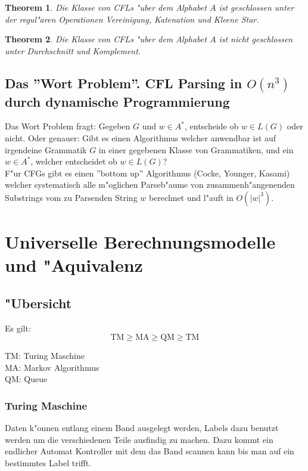 \documentclass[german, 10pt, a4paper, twocolumn]{scrartcl}
\newtheorem{theorem}{Theorem}[section]
\theoremstyle{definition}
\theoremstyle{example}
\begin{document}
\begin{theorem}
	Die Klasse von CFLs "uber dem Alphabet $A$ ist geschlossen unter der regul"aren Operationen Vereinigung, Katenation und Kleene Star.
\end{theorem}

\begin{theorem}
	Die Klasse von CFLs "uber dem Alphabet $A$ ist nicht geschlossen unter Durchschnitt und Komplement.
\end{theorem}

\subsection{Das ''Wort Problem''. CFL Parsing in $O(n^3)$ durch dynamische Programmierung}

Das Wort Problem fragt: Gegeben $G$ und $w\in A^*$, entscheide ob $w \in L(G)$ oder nicht. Oder genauer: Gibt es einen Algorithmus welcher anwendbar ist auf irgendeine Grammatik $G$ in einer gegebenen Klasse von Grammatiken, und ein $w\in A^*$, welcher entscheidet ob $w\in L(G)$?\\

F"ur CFGs gibt es einen ''bottom up'' Algorithmus (Cocke, Younger, Kasami) welcher systematisch alle m"oglichen Parseb"aume von zusammenh"angenenden Substrings vom zu Parsenden String $w$ berechnet und l"auft in $O(|w|^3)$.

\section{Universelle Berechnungsmodelle und "Aquivalenz}

\subsection{"Ubersicht}

Es gilt:
\begin{displaymath}
	\mbox{TM} \geq \mbox{MA} \geq \mbox{QM} \geq \mbox{TM}
\end{displaymath}

TM: Turing Maschine\\
MA: Markov Algorithmus\\
QM: Queue

\subsubsection{Turing Maschine}

Daten k"onnen entlang einem Band ausgelegt werden, Labels dazu benutzt werden um die verschiedenen Teile ausfindig zu machen. Dazu kommt ein endlicher Automat Kontroller mit dem das Band scannen kann bis man auf ein bestimmtes Label trifft.
\end{document}
